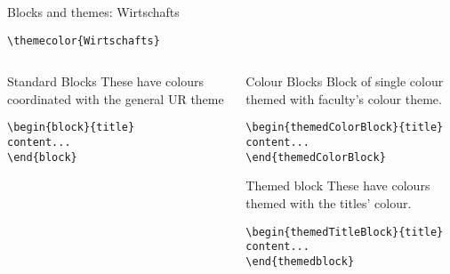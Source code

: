 \begingroup
{}
\begin{frame}[fragile]{Blocks and themes: Wirtschafts}
    \begin{center}\verb|\themecolor{Wirtschafts}|\end{center}
\begin{columns} %
\begin{column}{0.3\textwidth}
\begin{block}{Standard Blocks}
These have colours coordinated with the general UR theme
\begin{verbatim}
\begin{block}{title}
content...
\end{block}
\end{verbatim}
\end{block}
\end{column}
\begin{column}{0.7\textwidth}
\begin{themedColorBlock}{Colour Blocks}
Block of single colour themed with faculty's colour theme.
\small
\begin{verbatim}
\begin{themedColorBlock}{title}
content...
\end{themedColorBlock}
\end{verbatim}
\end{themedColorBlock}
\begin{themedTitleBlock} {Themed block}
These have colours themed with the titles' colour.
\small
\begin{verbatim}
\begin{themedTitleBlock}{title}
content...
\end{themedblock}
\end{verbatim}
\end{themedTitleBlock}
\end{column}
\end{columns}
\end{frame}
\endgroup


